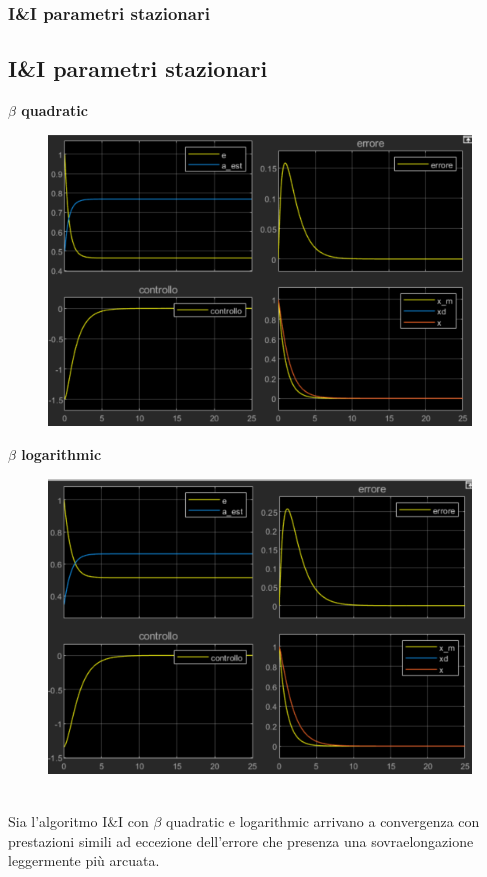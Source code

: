\documentclass{beamer}
\begin{document}
\begin{frame}
	\frametitle{I\&I parametri stazionari}
	\subsection{I\&I parametri stazionari}
	\begin{minipage}[t]{0.45\textwidth}
		\textbf{\(\beta\) quadratic}
		\begin{figure}
			\includegraphics[scale=0.35]{2022-05-21-10-25-55.png} %
		\end{figure}
	\end{minipage}
	\begin{minipage}[t]{0.45\textwidth}
		\textbf{\(\beta\) logarithmic}
		\begin{figure}
			\includegraphics[scale=0.35]{2022-05-21-10-27-23.png} %
		\end{figure}
	\end{minipage}
	\vspace{0.1cm}\\
	Sia l'algoritmo I\&I con \(\beta\) quadratic e logarithmic arrivano a convergenza con prestazioni simili ad eccezione dell'errore che presenza una sovraelongazione leggermente più arcuata.
\end{frame}
\end{document}
